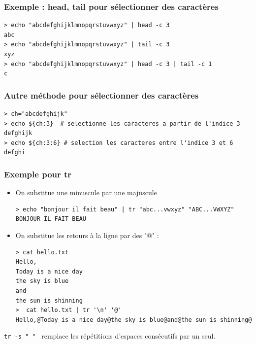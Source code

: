 \documentclass{beamer}
\newenvironment{terminal}{\color{white}\begin{snugshade*}}
{\end{snugshade*}\color{black}}
\begin{document}
\begin{frame}[fragile]
  \frametitle{Exemple : head, tail pour sélectionner des caractères}
  \begin{terminal}
        \begin{scriptsize}
\begin{verbatim}
> echo "abcdefghijklmnopqrstuvwxyz" | head -c 3
abc
> echo "abcdefghijklmnopqrstuvwxyz" | tail -c 3
xyz
> echo "abcdefghijklmnopqrstuvwxyz" | head -c 3 | tail -c 1
c
\end{verbatim}
\end{scriptsize}
\end{terminal}

\end{frame}



\begin{frame}[fragile]
\frametitle{Autre méthode pour sélectionner des caractères}
 \begin{terminal}
        \begin{scriptsize}
\begin{verbatim}
> ch="abcdefghijk"
> echo ${ch:3}  # selectionne les caracteres a partir de l'indice 3
defghijk
> echo ${ch:3:6} # selection les caracteres entre l'indice 3 et 6
defghi
\end{verbatim}
\end{scriptsize}
\end{terminal}


\end{frame}

\begin{frame}[fragile]

  \frametitle{Exemple pour tr}
  \begin{itemize}
  \item On substitue une minuscule par une majuscule
    \begin{terminal}
    \begin{scriptsize}
\begin{verbatim}
> echo "bonjour il fait beau" | tr "abc...vwxyz" "ABC...VWXYZ"
BONJOUR IL FAIT BEAU
\end{verbatim}
    \end{scriptsize}
    \end{terminal}
  \item On substitue les retours à la ligne par des "@" :
    \begin{terminal}
      \begin{scriptsize}
\begin{verbatim}
> cat hello.txt
Hello,
Today is a nice day
the sky is blue
and
the sun is shinning
>  cat hello.txt | tr '\n' '@'
Hello,@Today is a nice day@the sky is blue@and@the sun is shinning@
\end{verbatim}
      \end{scriptsize}
      \end{terminal}
  \end{itemize}
  \verb|tr -s " " | remplace les répétitions d'espaces consécutifs par un seul.
\end{frame}
\end{document}
